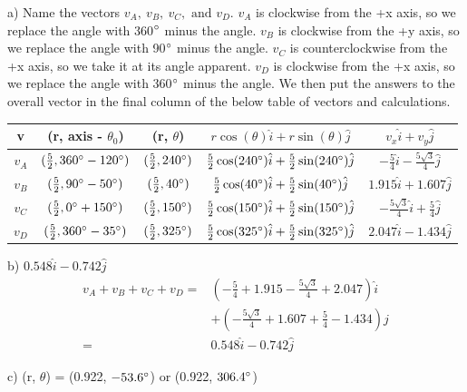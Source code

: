\documentclass[12pt]{article}
\begin{document}
a) Name the vectors $v_A,\ v_B,\ v_C, \text{ and } v_D$. $v_A$ is clockwise from the +x axis, so we replace the angle with 360$\degree$ minus the angle. $v_B$ is clockwise from the +y axis, so we replace the angle with 90$\degree$ minus the angle. $v_C$ is counterclockwise from the +x axis, so we take it at its angle apparent. $v_D$ is clockwise from the +x axis, so we replace the angle with 360$\degree$ minus the angle. We then put the answers to the overall vector in the final column of the below table of vectors and calculations.
\begin{center}
    \begin{tabular}{ c | c | c | c | c }
        v & (r, axis - $\theta_0$) & (r, $\theta$) & $r\cos(\theta)\hat{i}+r\sin(\theta)\hat{j}$ & $v_x\hat{i} + v_y\hat{j}$\\ \hline
        $v_A$ & $(\frac{5}{2}, 360\degree - 120\degree)$ & $(\frac{5}{2}, 240\degree)$ & $\frac{5}{2}\cos(240\degree)\hat{i} + \frac{5}{2}\sin(240\degree)\hat{j}$ & $-\frac{5}{4}\hat{i} -\frac{5\sqrt{3}}{4}\hat{j}$\\
        $v_B$ & $(\frac{5}{2}, 90\degree - 50\degree)$ & $(\frac{5}{2}, 40\degree)$ & $\frac{5}{2}\cos(40\degree)\hat{i} + \frac{5}{2}\sin(40\degree)\hat{j}$ & $1.915\hat{i} + 1.607\hat{j}$\\
        $v_C$ & $(\frac{5}{2}, 0\degree + 150\degree)$ & $(\frac{5}{2}, 150\degree)$ & $\frac{5}{2}\cos(150\degree)\hat{i} + \frac{5}{2}\sin(150\degree)\hat{j}$ & $-\frac{5\sqrt{3}}{4}\hat{i} + \frac{5}{4}\hat{j}$\\
        $v_D$ & $(\frac{5}{2}, 360\degree - 35\degree)$ & $(\frac{5}{2}, 325\degree)$ & $\frac{5}{2}\cos(325\degree)\hat{i} + \frac{5}{2}\sin(325\degree)\hat{j}$ & $2.047\hat{i} -1.434\hat{j}$\\
    \end{tabular}
\end{center}

\pagebreak
b) $0.548\hat{i} - 0.742\hat{j}$
\begin{align*}
    v_A+v_B+v_C+v_D =   &(-\frac{5}{4} + 1.915 - \frac{5\sqrt{3}}{4} + 2.047)\hat{i}\\
                        &+ (-\frac{5\sqrt{3}}{4} + 1.607 + \frac{5}{4} - 1.434)\hat{j}\\
                    =   &\boxed{0.548\hat{i} - 0.742\hat{j}}
\end{align*}

c) (r, $\theta$) = (0.922, $-53.6\degree$) or (0.922, $306.4\degree$)
\end{document}
